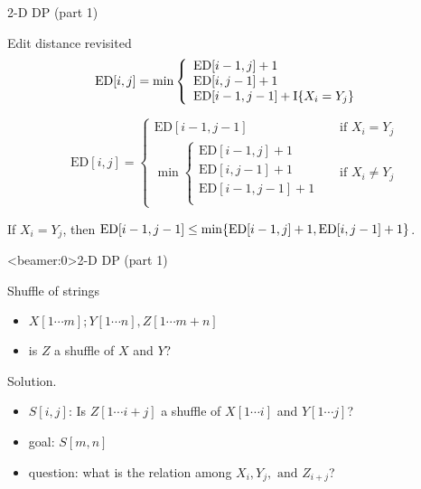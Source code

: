 \begin{frame}{2-D DP (part 1)}
  \begin{exampleblock}{Edit distance revisited}
    \begin{displaymath}
      \text{ED}[i,j] = \min \left\{ \begin{array}{ll}
	\text{ED}[i-1,j] + 1 &  \\
	\text{ED}[i,j-1] + 1 & \\
	\text{ED}[i-1,j-1] + \text{I}\{X_{i} = Y_{j}\} &
      \end{array} \right.
    \end{displaymath}
  \end{exampleblock}
    
  \begin{exampleblock}{}
    \begin{displaymath}
      \text{ED}[i,j] = \left\{ \begin{array}{ll}
        \text{ED}[i-1,j-1] & \text{if } X_{i} = Y_{j}  \\
        \min \left\{ \begin{array}{ll}
          \text{ED}[i-1,j] + 1 &  \\
          \text{ED}[i,j-1] + 1 &  \\
          \text{ED}[i-1,j-1] + 1 \\
	\end{array} \right. & \text{if } X_{i} \neq Y_{j}
      \end{array} \right.
    \end{displaymath}
  \end{exampleblock}

  \begin{theorem}
    If $X_{i} = Y_{j}$, then $\text{ED}[i-1,j-1] \le \min\{\text{ED}[i-1,j] + 1, \text{ED}[i,j-1] + 1\}$.
  \end{theorem}
\end{frame}
\begin{frame}<beamer:0>{2-D DP (part 1)}
  \begin{exampleblock}{Shuffle of strings }
    \begin{itemize}
      \item $X[1 \cdots m]; Y[1 \cdots n], Z[1 \cdots m+n]$
      \item is $Z$ a shuffle of $X$ and $Y$?
    \end{itemize}
  \end{exampleblock}

  \begin{block}{Solution.}
    \begin{itemize}
      \item $S[i,j]$: Is $Z[1 \cdots i+j]$ a shuffle of $X[1 \cdots i]$ and $Y[1 \cdots j]$?
      \item goal: $S[m,n]$
      \item question: what is the relation among $X_{i}, Y_{j}, \text{ and } Z_{i+j}$?
    \end{itemize}
  \end{block}
\end{frame}
